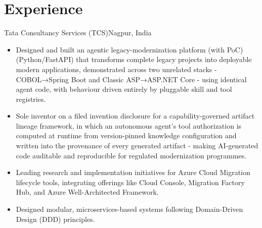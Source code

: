 \documentclass[11pt,a4paper,sans]{moderncv}
\begin{document}
\section{Experience} 
{Tata Consultancy Services (TCS)}{Nagpur, India}{}{
\begin{itemize} 
    \item Designed and built an agentic legacy-modernization platform (with PoC) (Python/FastAPI) that transforms complete legacy projects into deployable modern applications, demonstrated across two unrelated stacks - COBOL→Spring Boot and Classic ASP→ASP.NET Core - using identical agent code, with behaviour driven entirely by pluggable skill and tool registries.
    \item Sole inventor on a filed invention disclosure for a capability-governed artifact lineage framework, in which an autonomous agent's tool authorization is computed at runtime from version-pinned knowledge configuration and written into the provenance of every generated artifact - making AI-generated code auditable and reproducible for regulated modernization programmes.
    \item Leading research and implementation initiatives for Azure Cloud Migration lifecycle tools, integrating offerings like Cloud Console, Migration Factory Hub, and Azure Well-Architected Framework.
    \item Designed modular, microservices-based systems following Domain-Driven Design (DDD) principles. 
\end{itemize}}
\vspace{0.5em}
\vspace{0.5em}
\end{document}
